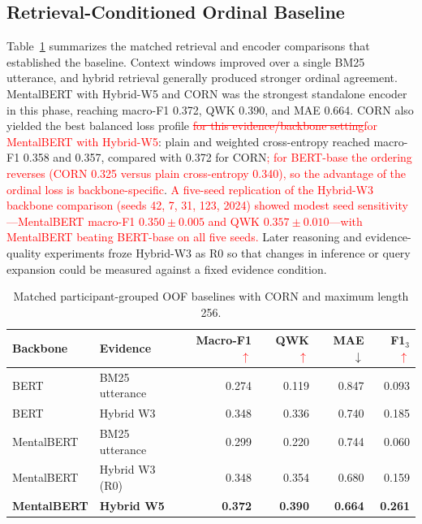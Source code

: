 \documentclass{article}
\DeclareRobustCommand{\rev}[1]{\textcolor{red}{#1}}
\DeclareRobustCommand{\del}[1]{\textcolor{red}{\sout{#1}}}
\newcommand{\best}[1]{\textbf{#1}}
\begin{document}
\subsection{Retrieval-Conditioned Ordinal Baseline}
\label{subsec:baseline-results}
Table~\ref{tab:baseline} summarizes the matched retrieval and encoder comparisons that established the baseline. Context windows improved over a single BM25 utterance, and hybrid retrieval generally produced stronger ordinal agreement. MentalBERT with Hybrid-W5 and CORN was the strongest standalone encoder in this phase, reaching macro-F1 0.372, QWK 0.390, and MAE 0.664. CORN also yielded the best balanced loss profile \del{for this evidence/backbone setting}\rev{for MentalBERT with Hybrid-W5}: plain and weighted cross-entropy reached macro-F1 0.358 and 0.357, compared with 0.372 for CORN\rev{; for BERT-base the ordering reverses (CORN 0.325 versus plain cross-entropy 0.340), so the advantage of the ordinal loss is backbone-specific}. \rev{A five-seed replication of the Hybrid-W3 backbone comparison (seeds 42, 7, 31, 123, 2024) showed modest seed sensitivity---MentalBERT macro-F1 $0.350\pm0.005$ and QWK $0.357\pm0.010$---with MentalBERT beating BERT-base on all five seeds.} Later reasoning and evidence-quality experiments froze Hybrid-W3 as R0 so that changes in inference or query expansion could be measured against a fixed evidence condition.

\begin{table}[t]
  \caption{Matched participant-grouped OOF baselines with CORN and maximum length 256.}
  \label{tab:baseline}
  \centering
  \scriptsize
  \begin{tabular}{llrrrr}
    \toprule
    Backbone & Evidence & Macro-F1\rev{ $\uparrow$} & QWK\rev{ $\uparrow$} & MAE $\downarrow$ & F1$_3$\rev{ $\uparrow$} \\
    \midrule
    BERT & BM25 utterance & 0.274 & 0.119 & 0.847 & 0.093 \\
    BERT & Hybrid W3 & 0.348 & 0.336 & 0.740 & 0.185 \\
    MentalBERT & BM25 utterance & 0.299 & 0.220 & 0.744 & 0.060 \\
    MentalBERT & Hybrid W3 (R0) & 0.348 & 0.354 & 0.680 & 0.159 \\
    \best{MentalBERT} & \best{Hybrid W5} & \best{0.372} & \best{0.390} & \best{0.664} & \best{0.261} \\
    \bottomrule
  \end{tabular}
\end{table}
\end{document}
